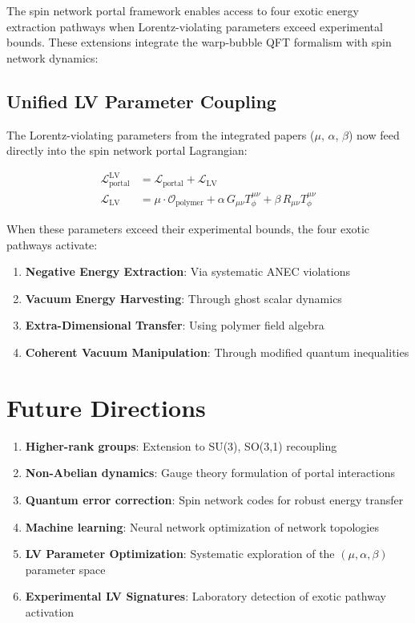\documentclass{article}
\begin{document}
The spin network portal framework enables access to four exotic energy extraction pathways when Lorentz-violating parameters exceed experimental bounds. These extensions integrate the warp-bubble QFT formalism with spin network dynamics:









\subsection{Unified LV Parameter Coupling}

The Lorentz-violating parameters from the integrated papers ($\mu$, $\alpha$, $\beta$) now feed directly into the spin network portal Lagrangian:

\begin{align}
\mathcal{L}_{\text{portal}}^{\text{LV}} &= \mathcal{L}_{\text{portal}} + \mathcal{L}_{\text{LV}} \\
\mathcal{L}_{\text{LV}} &= \mu \cdot \mathcal{O}_{\text{polymer}} + \alpha \, G_{\mu\nu}T^{\mu\nu}_\phi + \beta \, R_{\mu\nu}T^{\mu\nu}_\phi
\end{align}

When these parameters exceed their experimental bounds, the four exotic pathways activate:
\begin{enumerate}
\item \textbf{Negative Energy Extraction}: Via systematic ANEC violations
\item \textbf{Vacuum Energy Harvesting}: Through ghost scalar dynamics  
\item \textbf{Extra-Dimensional Transfer}: Using polymer field algebra
\item \textbf{Coherent Vacuum Manipulation}: Through modified quantum inequalities
\end{enumerate}

\section{Future Directions}

\begin{enumerate}
\item \textbf{Higher-rank groups}: Extension to SU(3), SO(3,1) recoupling
\item \textbf{Non-Abelian dynamics}: Gauge theory formulation of portal interactions
\item \textbf{Quantum error correction}: Spin network codes for robust energy transfer
\item \textbf{Machine learning}: Neural network optimization of network topologies
\item \textbf{LV Parameter Optimization}: Systematic exploration of the $(\mu, \alpha, \beta)$ parameter space
\item \textbf{Experimental LV Signatures}: Laboratory detection of exotic pathway activation
\end{enumerate}
\end{document}
